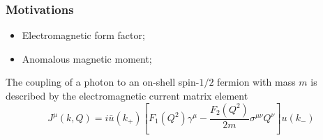 \begin{frame}
    \frametitle{Motivations}
    \begin{itemize}
        \item Electromagnetic form factor;
        \item Anomalous magnetic moment;
    \end{itemize}
    \vspace{2mm}

    The coupling of a photon to an on-shell spin-$1/2$ fermion with mass $m$ is described by the electromagnetic
    current matrix element
    \begin{equation}
        \label{eq:1}
        J^\mu(k, Q)=i\bar{u}(k_+)\left[F_1(Q^2)\gamma^\mu-\frac{F_2(Q^2)}{2m}\sigma^{\mu\nu}Q^\nu\right]u(k_-)
    \end{equation}
\end{frame}
\endinput
